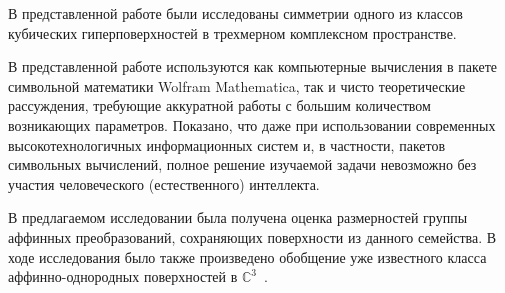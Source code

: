 \documentclass[../main.tex]{subfiles}
\begin{document}
В представленной работе были исследованы симметрии одного из классов кубических гиперповерхностей в трехмерном комплексном пространстве.

В представленной работе используются как компьютерные вычисления в пакете символьной математики {\ttfamily Wolfram Mathematica}, так и чисто теоретические рассуждения, требующие аккуратной работы с большим количеством возникающих параметров. Показано, что даже при использовании современных высокотехнологичных информационных систем и, в частности, пакетов символьных вычислений, полное решение изучаемой задачи невозможно без участия человеческого (естественного) интеллекта.

В предлагаемом исследовании была получена оценка размерностей группы аффинных преобразований, сохраняющих поверхности из данного семейства. В ходе исследования было также произведено обобщение уже известного класса аффинно-однородных поверхностей в $\mathbb{C}^3$~\cite{ALS}.
\end{document}
